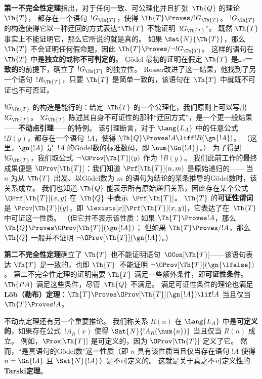 \textbf{第一不完全性定理}指出，对于任何一致、可公理化并且扩张~$\Th{Q}$ 的理论~$\Th{T}$，
都存在一个语句~$!G_\Th{T}$，使得 $\Th{T} \Proves/
!G_\Th{T}$。
$!G_\Th{T}$ 的构造使得它以一种迂回的方式表达“$\Th{T}$ 不能证明~$!G_\Th{T}$”。
既然 $\Th{T}$ 事实上不能证明它，那么它所说的就是真的。
如果 $\Sat{N}{\Th{T}}$，那么 $\Th{T}$ 不会证明任何假命题，因此 $\Th{T} \Proves/ \lnot !G_\Th{T}$。
这样的语句在~$\Th{T}$ 中是\textbf{独立的}或称\textbf{不可判定的}。
Gödel 最初的证明在假定 $\Th{T}$ 是\textbf{$\omega$-一致的}的前提下，确立了 $!G_\Th{T}$ 的独立性。
Rosser改进了这一结果，他找到了另一个语句~$!R_\Th{T}$，只要 $\Th{T}$ 是简单一致的，该语句在~$\Th{T}$ 中就既不可证也不可否证。

$!G_\Th{T}$ 的构造是能行的：给定~$\Th{T}$ 的一个公理化，我们原则上可以写出~$!G_\Th{T}$。
$!G_\Th{T}$ 陈述其自身不可证性的那种“迂回方式”，是一个更一般结果——\textbf{不动点引理}——的特例。
该引理断言，对于 $\Lang{L_A}$ 中的任意公式~$!B(y)$，都存在一个语句~$!A$，使得 $\Th{Q} \Proves !A \liff
!B(\gn{!A})$。
（这里，$\gn{!A}$ 是~$!A$ 的Gödel数的标准数码，即 $\num{\Gn{!A}}$。）
为了得到 $!G_\Th{T}$，我们取公式~$\lnot\OProv[\Th{T}](y)$ 作为~$!B(y)$。
我们此前工作的最终成果便是 $\OProv[\Th{T}]$：我们知道 $\Prf[\Th{T}](n, m)$ 是原始递归的——
当 $n$ 为从 $\Th{T}$ 出发、以Gödel数为 $m$ 的语句为结论的某条推导的Gödel数时，该关系成立。
我们也知道 $\Th{Q}$ 能表示所有原始递归关系，因此存在某个公式 $\OPrf[\Th{T}](x,y)$ 在~$\Th{Q}$ 中表示~$\Prf[\Th{T}]$。
$\Th{T}$ 的\textbf{可证性谓词}是 $\Prov[\Th{T}](y)$，即 $\lexists[x][\Prf[\Th{T}](x, y)]$，它表达了在~$\Th{T}$ 中可证这一性质。
（但它并不表示该性质：如果 $\Th{T} \Proves !A$，那么 $\Th{Q} \Proves \OProv[\Th{T}](\gn{!A})$；
但如果 $\Th{T} \Proves/ !A$，那么 $\Th{Q}$ 一般并不证明 $\lnot
\OProv[\Th{T}](\gn{!A})$。）

\textbf{第二不完全性定理}确立了 $\Th{T}$ 也不能证明语句~$\OCon[\Th{T}]$——该语句表达 $\Th{T}$ 是一致的，也即 $\Th{T}$~不能证明 $\lnot
\OProv[\Th{T}](\gn{\lfalse})$。
第二不完全性定理的证明需要 $\Th{T}$ 满足一些额外条件，即\textbf{可证性条件}。
$\Th{PA}$ 满足这些条件，尽管~$\Th{Q}$ 不满足。
满足可证性条件的理论也满足\textbf{Löb（勒布）定理}：$\Th{T} \Proves
\OProv[\Th{T}](\gn{!A}) \lif !A$ 当且仅当 $\Th{T} \Proves !A$。

不动点定理还有另一个重要推论。
我们称关系 $R(n)$ 在 $\Lang{L_A}$ 中是\textbf{可定义的}，如果存在公式~$!A_R(x)$ 使得 $\Sat{N}{!A_R(\num{n})}$ 当且仅当 $R(n)$ 成立。
例如，$\Prov[\Th{T}]$ 是可定义的，因为 $\OProv[\Th{T}]$ 定义了它。
然而，“是真语句的Gödel数”这一性质（即 $n$ 具有该性质当且仅当存在语句 $!A$ 使得 $n = \Gn{!A}$ 且 $\Sat{N}{!A}$）是不可定义的。
这就是关于真之不可定义性的\textbf{Tarski定理}。